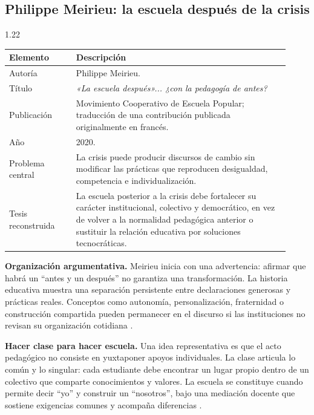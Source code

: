 \documentclass[spanish,letterpaper,oneside]{article}
\begin{document}
\subsection{Philippe Meirieu: la escuela después de la crisis}

\begin{reportelecturabox}[title={Reporte de lectura 1: Philippe Meirieu}]
\begin{spacing}{1.22}
\begin{fichalecturabox}
\begin{tabular}{@{}p{0.22\linewidth}p{0.70\linewidth}@{}}
\toprule
\textbf{Elemento} & \textbf{Descripción} \\
\midrule
Autoría & Philippe Meirieu. \\
Título & \textit{«La escuela después»... ¿con la pedagogía de antes?} \\
Publicación & Movimiento Cooperativo de Escuela Popular; traducción de una contribución publicada originalmente en francés. \\
Año & 2020. \\
Problema central & La crisis puede producir discursos de cambio sin modificar las prácticas que reproducen desigualdad, competencia e individualización. \\
Tesis reconstruida & La escuela posterior a la crisis debe fortalecer su carácter institucional, colectivo y democrático, en vez de volver a la normalidad pedagógica anterior o sustituir la relación educativa por soluciones tecnocráticas. \\
\bottomrule
\end{tabular}
\end{fichalecturabox}

\noindent\textbf{Organización argumentativa.}\enspace
Meirieu inicia con una advertencia: afirmar que habrá un ``antes y un después'' no garantiza una transformación. La historia educativa muestra una separación persistente entre declaraciones generosas y prácticas reales. Conceptos como autonomía, personalización, fraternidad o construcción compartida pueden permanecer en el discurso si las instituciones no revisan su organización cotidiana \citep{meirieu2020escuela}.

\medskip\noindent\textbf{Hacer clase para hacer escuela.}\enspace
Una idea representativa es que el acto pedagógico no consiste en yuxtaponer apoyos individuales. La clase articula lo común y lo singular: cada estudiante debe encontrar un lugar propio dentro de un colectivo que comparte conocimientos y valores. La escuela se constituye cuando permite decir ``yo'' y construir un ``nosotros'', bajo una mediación docente que sostiene exigencias comunes y acompaña diferencias \citep{meirieu2020escuela}.


\end{spacing}
\end{reportelecturabox}
\end{document}
